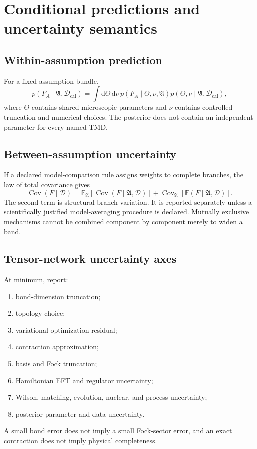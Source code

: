 \documentclass[11pt]{article}
\newcommand{\dd}{\mathrm{d}}
\newcommand{\Cov}{\operatorname{Cov}}
\newcommand{\cD}{\mathcal D}
\newcommand{\calib}{\mathrm{cal}}
\newcommand{\Aset}{\mathfrak A}
\begin{document}
\section{Conditional predictions and uncertainty semantics}
\label{sec:conditional-uncertainty}

\subsection{Within-assumption prediction}

For a fixed assumption bundle,
\begin{equation}
 p(F_A\mid\Aset,\cD_{\calib})
 =
 \int\dd\Theta\,\dd\nu\,
 p(F_A\mid\Theta,\nu,\Aset)
 p(\Theta,\nu\mid\Aset,\cD_{\calib}),
\label{eq:conditional-posterior-prediction}
\end{equation}
where \(\Theta\) contains shared microscopic parameters and \(\nu\) contains
controlled truncation and numerical choices.  The posterior does not contain
an independent parameter for every named TMD.

\subsection{Between-assumption uncertainty}

If a declared model-comparison rule assigns weights to complete branches, the
law of total covariance gives
\begin{equation}
 \Cov(F\mid\cD)
 =
 \mathbb E_{\Aset}
 \left[
 \Cov(F\mid\Aset,\cD)
 \right]
 +
 \Cov_{\Aset}
 \left[
 \mathbb E(F\mid\Aset,\cD)
 \right].
\label{eq:total-covariance-assumptions}
\end{equation}
The second term is structural branch variation.  It is reported separately
unless a scientifically justified model-averaging procedure is declared.
Mutually exclusive mechanisms cannot be combined component by component merely
to widen a band.

\subsection{Tensor-network uncertainty axes}

At minimum, report:
\begin{enumerate}
 \item bond-dimension truncation;
 \item topology choice;
 \item variational optimization residual;
 \item contraction approximation;
 \item basis and Fock truncation;
 \item Hamiltonian EFT and regulator uncertainty;
 \item Wilson, matching, evolution, nuclear, and process uncertainty;
 \item posterior parameter and data uncertainty.
\end{enumerate}
A small bond error does not imply a small Fock-sector error, and an exact
contraction does not imply physical completeness.
\end{document}
